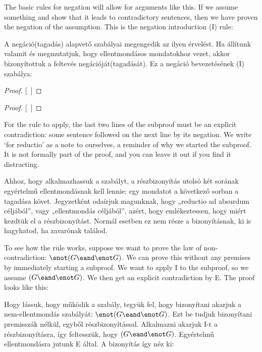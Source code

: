

The basic rules for negation will allow for arguments like this. If we assume something and show that it leads to contradictory sentences, then we have proven the negation of the assumption. This is the negation introduction ({\enot}I) rule:

A negáció(tagadás) alapvető szabályai megengedik az ilyen érvelést. Ha állítunk valamit és megmutatjuk, hogy ellentmondásos mondatokhoz vezet, akkor bizonyítottuk a feltevés negációját(tagadását). Ez a negáció bevezetésének ({\enot}I) szabálya:

\begin{proof}
\open
\close
{}[\ ]{\enot{}}
\end{proof}

\begin{proof}
\open
\close
{}[\ ]{\enot{}}
\end{proof}

For the rule to apply, the last two lines of the subproof must be an explicit contradiction: some sentence followed on the next line by its negation. We write `for reductio' as a note to ourselves, a reminder of why we started the subproof. It is not formally part of the proof, and you can leave it out if you find it distracting.

Ahhoz, hogy alkalmazhassuk a szabályt, a részbizonyítás utolsó két sorának egyértelmű ellentmondásnak kell lennie: egy mondatot a következő sorban a tagadása követ. Jegyzetként odaírjuk magunknak, hogy „reductio ad absurdum céljából”, vagy „ellentmondás céljából”, azért, hogy emlékeztessen, hogy miért kezdtük el a részbizonyítást. Normál esetben ez nem része a bizonyításnak, ki is hagyhatod, ha zavarónak találod.

To see how the rule works, suppose we want to prove the law of non-contradiction: $\enot(G \eand \enot G)$. We can prove this without any premises by immediately starting a subproof. We want to apply {\enot}I to the subproof, so we assume $(G \eand \enot G)$. We then get an explicit contradiction by {\eand}E. The proof looks like this:

Hogy lássuk, hogy működik a szabály, tegyük fel, hogy bizonyítani akarjuk a nem-ellentmondás szabályát: $\enot(G \eand \enot G)$. Ezt be tudjuk bizonyítani premisszák nélkül, egyből részbizonyítással. Alkalmazni akarjuk {\enot}I-t a részbizonyításra, így feltesszük, hogy $(G \eand \enot G)$. Egyértelmű ellentmondásra jutunk {\eand}E által. A bizonyítás így néz ki:

